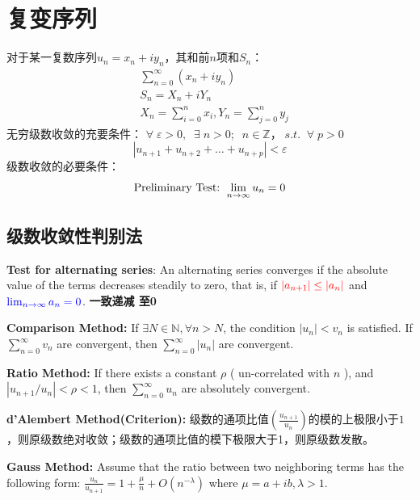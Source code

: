 \documentclass[10pt, a4paper, oneside]{ctexbook}
\begin{document}
\chapter{复变序列}
对于某一复数序列$u_n=x_n+iy_n$，其和前$n$项和$S_n$：
\begin{equation*}
    \begin{aligned}
    &\sum_{n=0}^{\infty}\left(x_{n}+i y_{n}\right) \\
    &S_{n}=X_{n}+i Y_{n} \\
    &X_{n}=\sum_{i=0}^{n} x_{i}, Y_{n}=\sum_{j=0}^{n} y_{j}
    \end{aligned}
\end{equation*}
无穷级数收敛的充要条件：
$\forall\; \varepsilon > 0,\;\; \exists\; n>0;\;\; n \in \mathbb{Z}， \; s.t.\;\; \forall \; p>0\:$
\begin{equation*}
    \left|u_{n+1}+u_{n+2}+\ldots+u_{n+p}\right|<\varepsilon
\end{equation*}
级数收敛的必要条件：
\begin{equation*}
    \text{\boldmath Preliminary Test: } \lim_{n\to \infty} u_n = 0
\end{equation*}
\section{级数收敛性判别法}
\textbf{Test for alternating series}: An alternating series converges if the absolute value of the terms decreases steadily to zero, that is, if $\color{red} \left|a_{n+1}\right| \leq\left|a_{n}\right|$ and $\color{blue} \lim _{n \rightarrow \infty} a_{n}=0$.
\textbf{\color{red} 一致递减 \color{blue}至0}

\textbf{Comparison Method: }If $\exists N \in \mathbb{N}, \forall n>N$, the condition $\left|u_{n}\right|<v_{n}$ is satisfied. If $\displaystyle \sum_{n=0}^{\infty} v_{n}$ are convergent, then $\displaystyle \sum_{n=0}^{\infty}\left|u_{n}\right|$ are convergent.

\textbf{Ratio Method: }If there exists a constant $\rho$ ({\color{red} un-correlated with $n$ }), and $\left|u_{n+1} / u_{n}\right|<\rho<1$, then $\displaystyle \sum_{n=0}^{\infty} u_{n}$ are absolutely convergent.

\textbf{d'Alembert Method(Criterion): }级数的通项比值$\left(\displaystyle \frac{u_{n+1}}{u_n}\right)$的{\color{red}模}的上极限小于$1$，则原级数绝对收敛；级数的通项比值的模下极限大于1，则原级数发散。

\textbf{Gauss Method: }Assume that the ratio between two neighboring terms has the following form: $\displaystyle \frac{u_{n}}{u_{n+1}}=1+\frac{\mu}{n}+O\left(n^{-\lambda}\right)$
where $\mu=a+i b, \lambda>1$. 
\end{document}
